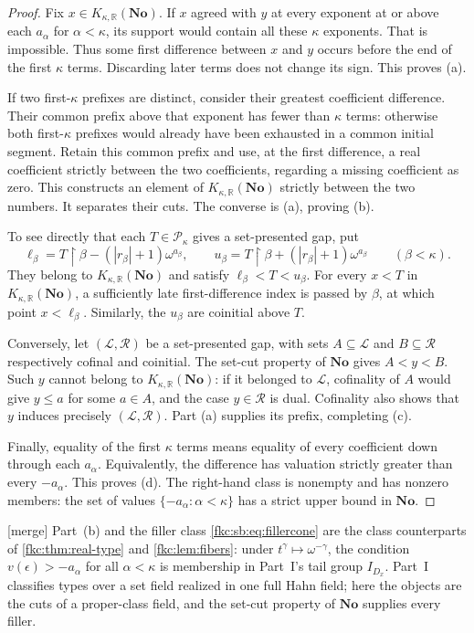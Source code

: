 \documentclass[11pt,letterpaper]{article}
\numberwithin{equation}{section}
\theoremstyle{definition}
\theoremstyle{remark}
\newcommand{\R}{\mathbb R}
\newcommand{\No}{\mathbf{No}}
\newcommand{\mergetag}{\textup{\textsf{\small[merge]}}}%
\newcommand{\restr}{\mathbin{\upharpoonright}}
\newcommand{\KN}[2]{K_{#1,#2}(\No)}%
\begin{document}
\begin{proof}
Fix $x\in\KN\kappa\R$. If $x$ agreed with $y$ at every exponent at or above each $a_\alpha$ for $\alpha<\kappa$, its support would contain all these $\kappa$ exponents. That is impossible. Thus some first difference between $x$ and $y$ occurs before the end of the first $\kappa$ terms. Discarding later terms does not change its sign. This proves (a).

If two first-$\kappa$ prefixes are distinct, consider their greatest coefficient difference. Their common prefix above that exponent has fewer than $\kappa$ terms: otherwise both first-$\kappa$ prefixes would already have been exhausted in a common initial segment. Retain this common prefix and use, at the first difference, a real coefficient strictly between the two coefficients, regarding a missing coefficient as zero. This constructs an element of $\KN\kappa\R$ strictly between the two numbers. It separates their cuts. The converse is (a), proving (b).

To see directly that each $T\in\mathcal P_\kappa$ gives a set-presented gap, put
\begin{equation}\label{fkc:sb:eq:brackets}
 \ell_\beta=T\restr\beta-(|r_\beta|+1)\omega^{a_\beta},\qquad
 u_\beta=T\restr\beta+(|r_\beta|+1)\omega^{a_\beta}
       \qquad(\beta<\kappa).
\end{equation}
They belong to $\KN\kappa\R$ and satisfy $\ell_\beta<T<u_\beta$. For every $x<T$ in $\KN\kappa\R$, a sufficiently late first-difference index is passed by $\beta$, at which point $x<\ell_\beta$. Similarly, the $u_\beta$ are coinitial above $T$.

Conversely, let $(\mathcal L,\mathcal R)$ be a set-presented gap, with sets $A\subseteq\mathcal L$ and $B\subseteq\mathcal R$ respectively cofinal and coinitial. The set-cut property of $\No$ gives $A<y<B$. Such $y$ cannot belong to $\KN\kappa\R$: if it belonged to $\mathcal L$, cofinality of $A$ would give $y\le a$ for some $a\in A$, and the case $y\in\mathcal R$ is dual. Cofinality also shows that $y$ induces precisely $(\mathcal L,\mathcal R)$. Part (a) supplies its prefix, completing (c).

Finally, equality of the first $\kappa$ terms means equality of every coefficient down through each $a_\alpha$. Equivalently, the difference has valuation strictly greater than every $-a_\alpha$. This proves (d). The right-hand class is nonempty and has nonzero members: the set of values $\{-a_\alpha:\alpha<\kappa\}$ has a strict upper bound in $\No$.
\end{proof}
\mergetag{} Part~(b) and the filler class \eqref{fkc:sb:eq:fillercone} are the class counterparts of \cref{fkc:thm:real-type} and \cref{fkc:lem:fibers}: under $t^\gamma\mapsto\omega^{-\gamma}$, the condition $v(\epsilon)>-a_\alpha$ for all $\alpha<\kappa$ is membership in Part~I's tail group $I_{D_x}$. Part~I classifies types over a set field realized in one full Hahn field; here the objects are the cuts of a proper-class field, and the set-cut property of $\No$ supplies every filler.
\end{document}
